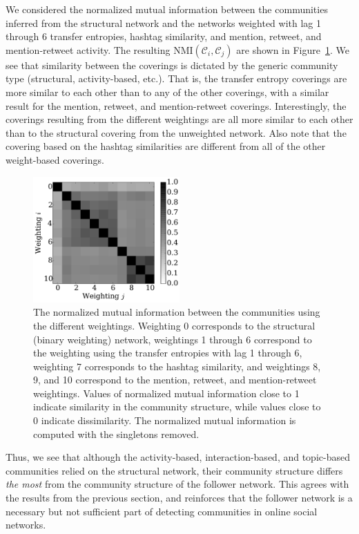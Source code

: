 We considered the normalized mutual information between the communities inferred from the structural network and the networks weighted with lag 1 through 6 transfer entropies, hashtag similarity, and mention, retweet, and mention-retweet activity. The resulting $\text{NMI}(\mathcal{C}_{i}, \mathcal{C}_{j})$ are shown in Figure~\ref{Fig-compare_coverings}. We see that similarity between the coverings is dictated by the generic community type (structural, activity-based, etc.). That is, the transfer entropy coverings are more similar to each other than to any of the other coverings, with a similar result for the mention, retweet, and mention-retweet coverings. Interestingly, the coverings resulting from the different weightings are all more similar to each other than to the structural covering from the unweighted network. Also note that the covering based on the hashtag similarities are different from all of the other weight-based coverings.

\begin{figure}[ht]
  \centering
\includegraphics[width=0.50\textwidth]{figures/nmi_singletons.pdf}
\caption{The normalized mutual information between the communities using the different weightings. Weighting 0 corresponds to the structural (binary weighting) network, weightings 1 through 6 correspond to the weighting using the transfer entropies with lag 1 through 6, weighting 7 corresponds to the hashtag similarity, and weightings 8, 9, and 10 correspond to the mention, retweet, and mention-retweet weightings. Values of normalized mutual information close to 1 indicate similarity in the community structure, while values close to 0 indicate dissimilarity. The normalized mutual information is computed with the singletons removed.}
\label{Fig-compare_coverings}
\end{figure}

Thus, we see that although the activity-based, interaction-based, and topic-based communities relied on the structural network, their community structure differs \emph{the most} from the community structure of the follower network. This agrees with the results from the previous section, and reinforces that the follower network is a necessary but not sufficient part of detecting communities in online social networks.

